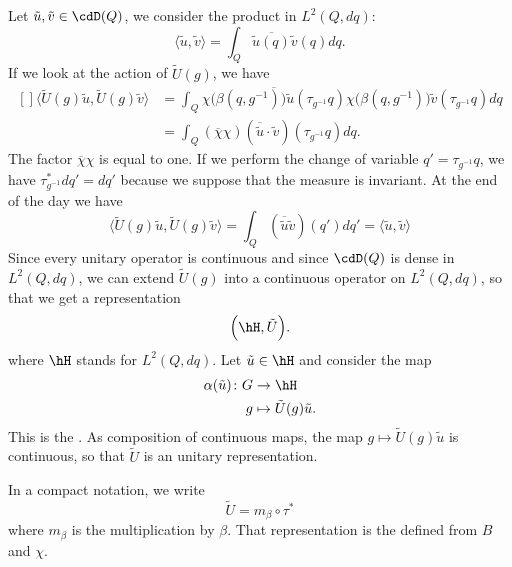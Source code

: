 Let $\tilde u,\tilde v\in\cdD(Q)$, we consider the product in $L^2(Q,dq)$:
\begin{equation}
	\langle \tilde u, \tilde v\rangle =\int_Q\overline{\tilde u(q)}\tilde v(q)dq.
\end{equation}
If we look at the action of $\tilde U(g)$, we have
\begin{equation}
	\begin{aligned}[]
		\langle \tilde U(g)\tilde u, \tilde U(g)\tilde v\rangle & =\int_Q\overline{ \chi\big( \beta(q,g^{-1}) \big)\tilde u(\tau_{g^{-1}}q) }\chi\big( \beta(q,g^{-1}) \big)\tilde v(\tau_{g^{-1}}q)dq \\
		                                                        & =\int_Q(\overline{ \chi }\chi)(\overline{ \tilde u }\cdot \tilde v)(\tau_{g^{-1}}q)dq.
	\end{aligned}
\end{equation}
The factor $\overline{ \chi }\chi$ is equal to one. If we perform the change of variable $q'=\tau_{g^{-1}}q$, we have $\tau_{g^{-1}}^*dq'=dq'$ because we suppose that the measure is invariant. At the end of the day we have
\begin{equation}
	\langle \tilde U(g)\tilde u, \tilde U(g)\tilde v\rangle =\int_Q(\overline{ \tilde u }\tilde v)(q')dq'=\langle \tilde u, \tilde v\rangle
\end{equation}
Since every unitary operator is continuous and since $\cdD(Q)$ is dense in $L^2(Q,dq)$, we can extend $\tilde U(g)$ into a continuous operator on $L^2(Q,dq)$, so that we get a representation
\begin{equation}
	\Big( \hH,\tilde U \Big).
\end{equation}
where $\hH$ stands for $L^2(Q,dq)$. Let $\tilde u\in\hH$ and consider the map
\begin{equation}
	\begin{aligned}
		\alpha(\tilde u)\colon G & \to \hH                      \\
		g                        & \mapsto \tilde U(g)\tilde u.
	\end{aligned}
\end{equation}
This is the . As composition of continuous maps, the map $g\mapsto \tilde U(g)\tilde u$ is continuous, so that $\tilde U$ is an unitary representation.

In a compact notation, we write
\begin{equation}
	\tilde U=m_{\beta}\circ\tau^*
\end{equation}
where $m_{\beta}$ is the multiplication by $\beta$. That representation is the  defined from $B$ and $\chi$.
